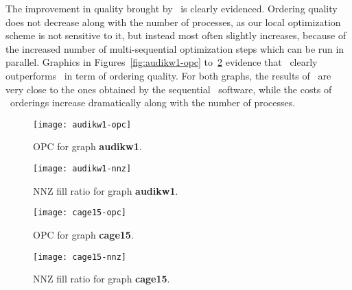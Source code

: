 \documentclass[fleqn,12pt,twoside]{article}
\begin{document}
The improvement in quality brought by \ptscotch\ is clearly evidenced.
Ordering quality does not decrease along with the number of processes,
as our local optimization scheme is not sensitive to it, but instead
most often slightly increases, because of the increased number of
multi-sequential optimization steps which can be run in parallel.
Graphics in Figures~\ref{fig:audikw1-opc} to~\ref{fig:cage15-nnz}
evidence that \ptscotch\ clearly outperforms \parmetis\ in term of
ordering quality. For both graphs, the results of \ptscotch\ are
very close to the ones obtained by the sequential \scotch\ software,
while the costs of \parmetis\ orderings increase dramatically along
with the number of processes.

\begin{figure}[htb]
\begin{minipage}[t]{0.47\textwidth}
\texttt{[image: audikw1-opc]}
\vspace*{-3.5em}
\caption{OPC for graph \textbf{audikw1}.}
\label{fig:audikw1-opc}
\end{minipage}\hspace{\fill}\begin{minipage}[t]{0.47\textwidth}
\texttt{[image: audikw1-nnz]}
\vspace*{-3.5em}
\caption{NNZ fill ratio for graph \textbf{audikw1}.}
\label{fig:audikw1-nnz}
\end{minipage}
\end{figure}

\begin{figure}[htb]
\begin{minipage}[t]{0.47\textwidth}
\texttt{[image: cage15-opc]}
\vspace*{-3.5em}
\caption{OPC for graph \textbf{cage15}.}
\label{fig:cage15-opc}
\end{minipage}\hspace{\fill}\begin{minipage}[t]{0.47\textwidth}
\texttt{[image: cage15-nnz]}
\vspace*{-3.5em}
\caption{NNZ fill ratio for graph \textbf{cage15}.}
\label{fig:cage15-nnz}
\end{minipage}
\end{figure}
\end{document}
